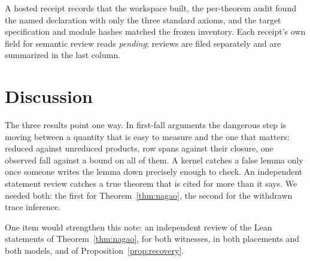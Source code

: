 \documentclass[11pt,a4paper]{article}
\theoremstyle{plain}
\theoremstyle{definition}
\theoremstyle{remark}
\begin{document}
A hosted receipt records that the workspace built, the per-theorem audit
found the named declaration with only the three standard axioms, and the
target specification and module hashes matched the frozen inventory. Each
receipt's own field for semantic review reads \emph{pending}; reviews are
filed separately and are summarized in the last column.

\section{Discussion}

The three results point one way. In first-fall arguments the dangerous
step is moving between a quantity that is easy to measure and the one
that matters: reduced against unreduced products, row spans against their
closure, one observed fall against a bound on all of them. A kernel catches a
false lemma only once someone writes the lemma down precisely enough to
check. An independent statement review catches a true theorem that is cited
for more than it says. We needed both: the first for Theorem~\ref{thm:nagao},
the second for the withdrawn trace inference.

One item would strengthen this note: an independent review of the Lean
statements of Theorem~\ref{thm:nagao}, for both witnesses, in both placements
and both models, and of Proposition~\ref{prop:recovery}.
\end{document}
